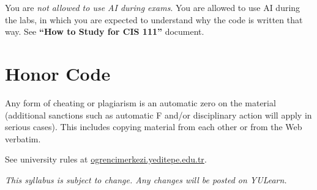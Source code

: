 You are \emph{not allowed to use AI during exams}. 
You are allowed to use AI during the labs,
in which you are expected to understand 
why the code is written that way. 
See \textbf{``How to Study for CIS 111''} document.




\section{Honor Code}

Any form of cheating or plagiarism is an automatic zero on the material 
(additional sanctions such as automatic F and/or disciplinary action will apply in serious cases). 
This includes copying material from each other or from the Web verbatim.

See university rules at 
\href{https://ogrencimerkezi.yeditepe.edu.tr/en/student-ethical-principles-responsibilities-and-code-conduct}
	{ogrencimerkezi.yeditepe.edu.tr}.



\vfill
\begin{center}
\textit{This syllabus is subject to change. Any changes will be
posted on YULearn.}
\end{center}

